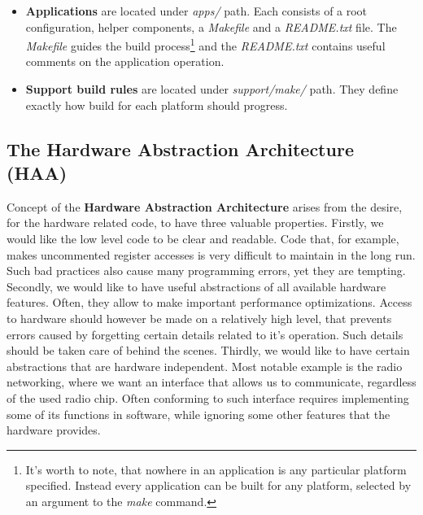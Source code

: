 \begin{itemize}
  \item {\bf Applications} are located under \emph{apps/} path. Each
    consists of a root configuration, helper components, a
    \emph{Makefile} and a \emph{README.txt} file. The \emph{Makefile}
    guides the build process\footnote{It's worth to note, that nowhere
    in an application is any particular platform specified. Instead
    every application can be built for any platform, selected by an
    argument to the \emph{make} command.} and the \emph{README.txt}
    contains useful comments on the application operation.

  \item {\bf Support build rules} are located under
    \emph{support/make/} path. They define exactly how build for each
    platform should progress.

\end{itemize}

\subsection{The Hardware Abstraction Architecture (HAA)}
\label{haa_arch}

Concept of the {\bf Hardware Abstraction Architecture} arises from the
desire, for the hardware related code, to have three valuable
properties. Firstly, we would like the low level code to be clear and
readable. Code that, for example, makes uncommented register accesses
is very difficult to maintain in the long run. Such bad practices also
cause many programming errors, yet they are tempting. Secondly, we
would like to have useful abstractions of all available hardware
features. Often, they allow to make important performance
optimizations. Access to hardware should however be made on a
relatively high level, that prevents errors caused by forgetting
certain details related to it's operation. Such details should be
taken care of behind the scenes. Thirdly, we would like to have
certain abstractions that are hardware independent. Most notable
example is the radio networking, where we want an interface that
allows us to communicate, regardless of the used radio chip. Often
conforming to such interface requires implementing some of its
functions in software, while ignoring some other features that the
hardware provides.

